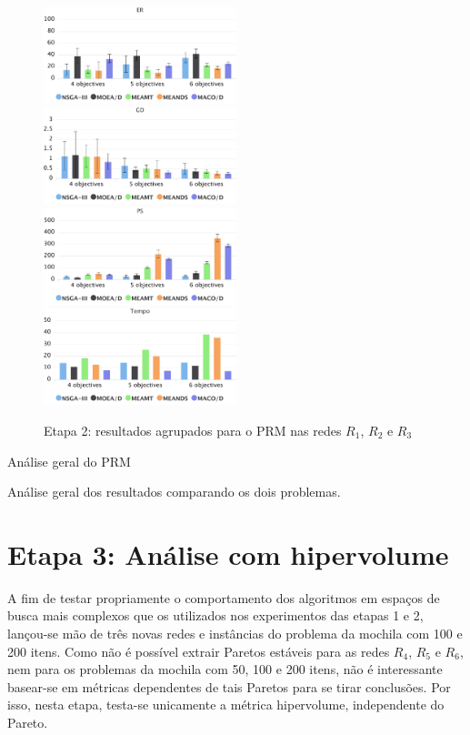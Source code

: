 \begin{figure}[!htbp]
	\caption{Etapa 2: resultados agrupados para o PRM nas redes $R_1$, $R_2$ e $R_3$}
	\label{fig_exp2_mrp_todos}
	\includegraphics[width=0.5\textwidth]{cap_experimentos/figs/etapa2/er-mrp-todos}
	\includegraphics[width=0.5\textwidth]{cap_experimentos/figs/etapa2/gd-mrp-todos}
	\includegraphics[width=0.5\textwidth]{cap_experimentos/figs/etapa2/ps-mrp-todos}
	\includegraphics[width=0.5\textwidth]{cap_experimentos/figs/etapa2/time-mrp-todos}
\end{figure}

Análise geral do PRM

Análise geral dos resultados comparando os dois problemas.

\section{Etapa 3: Análise com hipervolume}

A fim de testar propriamente o comportamento dos algoritmos em espaços de busca mais complexos que os utilizados nos experimentos das etapas 1 e 2, lançou-se mão de três novas redes e instâncias do problema da mochila com 100 e 200 itens. Como não é possível extrair Paretos estáveis para as redes $R_4$, $R_5$ e $R_6$, nem para os problemas da mochila com 50, 100 e 200 itens, não é interessante basear-se em métricas dependentes de tais Paretos para se tirar conclusões. Por isso, nesta etapa, testa-se unicamente a métrica hipervolume, independente do Pareto.

